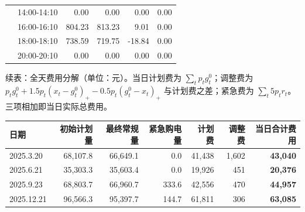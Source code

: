 \begin{table}[htbp]
\begin{tabular}{llrrrr}
     & 14{:}00-14{:}10 & 0.00 & 0.00 & 0.00 & 0.00 \\
     & 16{:}00-16{:}10 & 804.23 & 813.23 & 9.01 & 0.00 \\
     & 18{:}00-18{:}10 & 738.59 & 719.75 & -18.84 & 0.00 \\
     & 20{:}00-20{:}10 & 0.00 & 0.00 & 0.00 & 0.00 \\
    \bottomrule
  \end{tabular}
  \par\vspace{2pt}
  \begin{minipage}{\textwidth}\footnotesize
    续表：全天费用分解（单位：元）。当日计划费为 $\sum_t p_tg^0_t$；调整费为 $p_tg^0_t+1.5p_t(x_t-g^0_t)_+-0.5p_t(g^0_t-x_t)_+$ 与计划费之差；紧急费为 $\sum_t5p_tr_t$。三项相加即当日实际总费用。
  \end{minipage}
  \par\vspace{4pt}
  \begin{tabular}{lrrrrrr}
    \toprule
    日期 & 初始计划量 & 最终常规量 & 紧急购电量 & 计划费 & 调整费 & 当日合计费用 \\
    \midrule
    2025.3.20 & 68,107.8 & 66,649.1 & 0.0 & 41,438 & 1,602 & \textbf{43,040} \\
    2025.6.21 & 35,303.3 & 35,603.4 & 0.0 & 19,926 & 451 & \textbf{20,376} \\
    2025.9.23 & 68,803.7 & 66,960.7 & 333.6 & 42,556 & 470 & \textbf{44,957} \\
    2025.12.21 & 96,566.3 & 95,397.7 & 144.7 & 61,811 & 306 & \textbf{63,085} \\
    \bottomrule
  \end{tabular}
\end{table}


